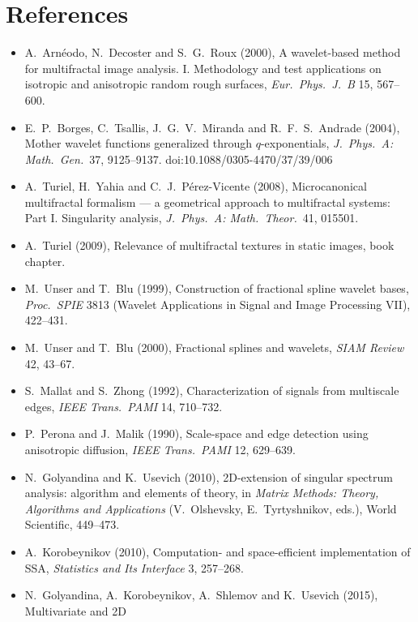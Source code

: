 \documentclass[10pt]{article}
\begin{document}
\section*{References}
\begin{itemize}\itemsep1pt
  \item A.~Arn\'eodo, N.~Decoster and S.~G.~Roux (2000), A wavelet-based method for
        multifractal image analysis. I. Methodology and test applications on isotropic and
        anisotropic random rough surfaces, \emph{Eur.\ Phys.\ J.\ B} 15, 567--600.
  \item E.~P.~Borges, C.~Tsallis, J.~G.~V.~Miranda and R.~F.~S.~Andrade (2004), Mother
        wavelet functions generalized through $q$-exponentials, \emph{J.\ Phys.\ A:
        Math.\ Gen.}\ 37, 9125--9137. doi:10.1088/0305-4470/37/39/006
  \item A.~Turiel, H.~Yahia and C.~J.~P\'erez-Vicente (2008), Microcanonical multifractal
        formalism --- a geometrical approach to multifractal systems: Part I.
        Singularity analysis, \emph{J.\ Phys.\ A: Math.\ Theor.}\ 41, 015501.
  \item A.~Turiel (2009), Relevance of multifractal textures in static images, book chapter.
  \item M.~Unser and T.~Blu (1999), Construction of fractional spline wavelet bases,
        \emph{Proc.\ SPIE} 3813 (Wavelet Applications in Signal and Image Processing VII),
        422--431.
  \item M.~Unser and T.~Blu (2000), Fractional splines and wavelets, \emph{SIAM Review}
        42, 43--67.
  \item S.~Mallat and S.~Zhong (1992), Characterization of signals from multiscale edges,
        \emph{IEEE Trans.\ PAMI} 14, 710--732.
  \item P.~Perona and J.~Malik (1990), Scale-space and edge detection using anisotropic
        diffusion, \emph{IEEE Trans.\ PAMI} 12, 629--639.
  \item N.~Golyandina and K.~Usevich (2010), 2D-extension of singular spectrum analysis:
        algorithm and elements of theory, in \emph{Matrix Methods: Theory, Algorithms and
        Applications} (V.~Olshevsky, E.~Tyrtyshnikov, eds.), World Scientific, 449--473.
  \item A.~Korobeynikov (2010), Computation- and space-efficient implementation of SSA,
        \emph{Statistics and Its Interface} 3, 257--268.
  \item N.~Golyandina, A.~Korobeynikov, A.~Shlemov and K.~Usevich (2015), Multivariate and 2D

\end{itemize}
\end{document}
